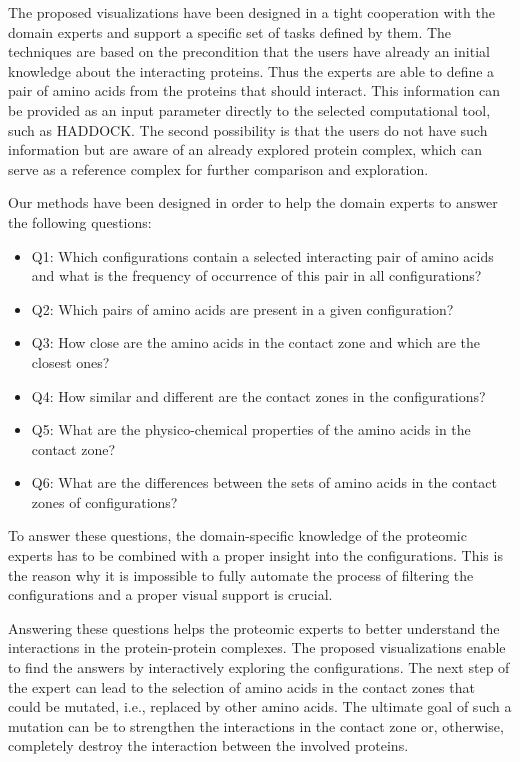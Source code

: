 \documentclass[twocolumn]{bmcart}%
\begin{document}
The proposed visualizations have been designed in a tight cooperation with the domain experts and support a specific set of tasks defined by them.
The techniques are based on the precondition that the users have already an initial knowledge about the interacting proteins.
Thus the experts are able to define a pair of amino acids from the proteins that should interact.
This information can be provided as an input parameter directly to the selected computational tool, such as HADDOCK.
The second possibility is that the users do not have such information but are aware of an already explored protein complex, which can serve as a reference complex for further comparison and exploration.

Our methods have been designed in order to help the domain experts to answer the following questions:
\begin{itemize}
\item Q1: Which configurations contain a selected interacting pair of amino acids and what is the frequency of occurrence of this pair in all configurations?
\item Q2: Which pairs of amino acids are present in a given configuration?
\item Q3: How close are the amino acids in the contact zone and which are the closest ones?
\item Q4: How similar and different are the contact zones in the configurations?
\item Q5: What are the physico-chemical properties of the amino acids in the contact zone?
\item Q6: What are the differences between the sets of amino acids in the contact zones of configurations?
\end{itemize}

To answer these questions, the domain-specific knowledge of the proteomic experts has to be combined with a proper insight into the configurations.
This is the reason why it is impossible to fully automate the process of filtering the configurations and a proper visual support is crucial.

Answering these questions helps the proteomic experts to better understand the interactions in the protein-protein complexes.
The proposed visualizations enable to find the answers by interactively exploring the configurations.
The next step of the expert can lead to the selection of amino acids in the contact zones that could be mutated, i.e., replaced by other amino acids.
The ultimate goal of such a mutation can be to strengthen the interactions in the contact zone or, otherwise, completely destroy the interaction between the involved proteins.
\end{document}
